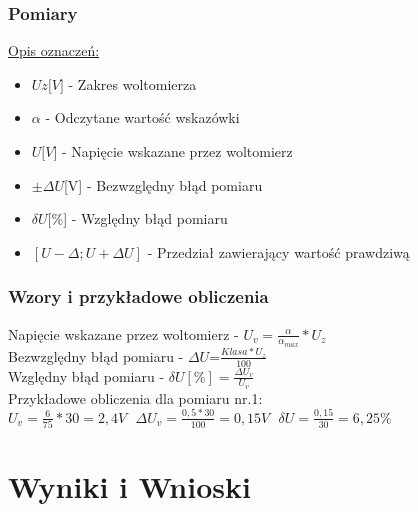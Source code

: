 \documentclass{extarticle}  %
\begin{document}
            \subsubsection{Pomiary}
                \begin{table}[H]
                    \caption{Wyniki pomiarowe oraz błędy pomiarowe dla ustalonego napięcia 3V }
                    \centering
                \end{table}
                \underline{Opis oznaczeń:}
                \begin{itemize}
                    \item $Uz{[}V{]}$ - Zakres woltomierza
                    \item $\alpha$ - Odczytane wartość wskazówki
                    \item $U{[}V{]}$ - Napięcie wskazane przez woltomierz
                    \item $\pm \Delta U${[}V{]} - Bezwzględny błąd pomiaru
                    \item $\delta U${[}\%{]} - Względny błąd pomiaru
                    \item $[U-\Delta ; U+\Delta U] $ - Przedział zawierający wartość prawdziwą
                \end{itemize}
            \subsubsection{Wzory i przykładowe obliczenia}
                Napięcie wskazane przez woltomierz - $U_v=\frac{\alpha}{\alpha_{max}}*U_z$\\
                Bezwzględny błąd pomiaru - $ \Delta U$=$\frac{Klasa*U_z}{100}$\\
                Względny błąd pomiaru - $\delta U[\%]=\frac{\Delta U_v}{U_v}$\\
                Przykładowe obliczenia dla pomiaru nr.1:\\
                $U_v=\frac{6}{75}\ast 30=2,4V \ \ \ \Delta U_v=\frac{0,5\ast 30}{100}=0,15V \ \ \ \delta U=\frac{0,15}{30}=6,25\%$

    \section{Wyniki i Wnioski}
    
\end{document}

